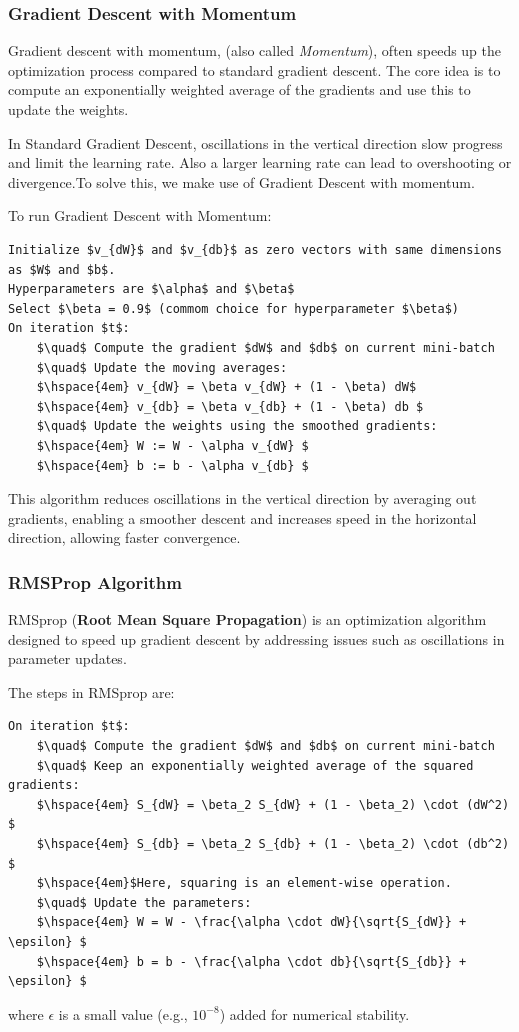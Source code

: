\documentclass[letterpaper,12pt,notitlepage,twoside]{report}
\begin{document}
\subsubsection{Gradient Descent with Momentum}
Gradient descent with momentum, (also called \emph{Momentum}), often speeds up the optimization process compared to standard gradient descent. The core idea is to compute an exponentially weighted average of the gradients and use this to update the weights.

In Standard Gradient Descent, oscillations in the vertical direction slow progress and limit the learning rate. Also a larger learning rate can lead to overshooting or divergence.To solve this, we make use of Gradient Descent with momentum.

To run Gradient Descent with Momentum:
\begin{lstlisting}
Initialize $v_{dW}$ and $v_{db}$ as zero vectors with same dimensions as $W$ and $b$.
Hyperparameters are $\alpha$ and $\beta$
Select $\beta = 0.9$ (commom choice for hyperparameter $\beta$)
On iteration $t$: 
	$\quad$ Compute the gradient $dW$ and $db$ on current mini-batch
	$\quad$ Update the moving averages:
	$\hspace{4em} v_{dW} = \beta v_{dW} + (1 - \beta) dW$
	$\hspace{4em} v_{db} = \beta v_{db} + (1 - \beta) db $
	$\quad$ Update the weights using the smoothed gradients:
	$\hspace{4em} W := W - \alpha v_{dW} $
	$\hspace{4em} b := b - \alpha v_{db} $		
\end{lstlisting}
This algorithm reduces oscillations in the vertical direction by averaging out gradients, enabling a smoother descent and increases speed in the horizontal direction, allowing faster convergence.

\subsubsection{RMSProp Algorithm}
RMSprop (\textbf{Root Mean Square Propagation}) is an optimization algorithm designed to speed up gradient descent by addressing issues such as oscillations in parameter updates.

The steps in RMSprop are:
\begin{lstlisting}
On iteration $t$: 
	$\quad$ Compute the gradient $dW$ and $db$ on current mini-batch
	$\quad$ Keep an exponentially weighted average of the squared gradients:
	$\hspace{4em} S_{dW} = \beta_2 S_{dW} + (1 - \beta_2) \cdot (dW^2) $
	$\hspace{4em} S_{db} = \beta_2 S_{db} + (1 - \beta_2) \cdot (db^2) $
	$\hspace{4em}$Here, squaring is an element-wise operation.
	$\quad$ Update the parameters:
	$\hspace{4em} W = W - \frac{\alpha \cdot dW}{\sqrt{S_{dW}} + \epsilon} $
	$\hspace{4em} b = b - \frac{\alpha \cdot db}{\sqrt{S_{db}} + \epsilon} $	
\end{lstlisting}
where \( \epsilon \) is a small value (e.g., \( 10^{-8} \)) added for numerical stability.
\end{document}
